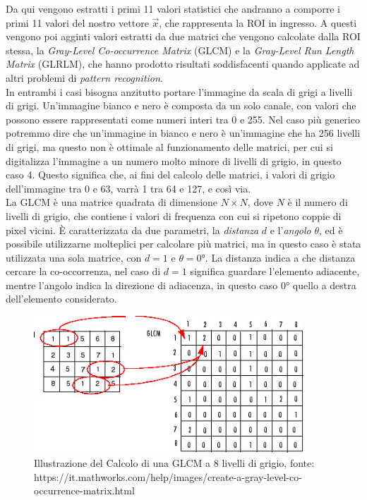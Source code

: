 Da qui vengono estratti i primi 11 valori statistici che andranno a comporre
i primi 11 valori del nostro vettore $\vec{x}$, che rappresenta la ROI in
ingresso.
A questi vengono poi agginti valori estratti da due matrici che vengono
calcolate dalla ROI stessa, la {\it Gray-Level Co-occurrence Matrix} (GLCM)
e la {\it Gray-Level Run Length Matrix} (GLRLM), che hanno prodotto
risultati soddisfacenti quando applicate ad altri problemi di
{\it pattern recognition}.\cite{GLCM}\\
In entrambi i casi bisogna anzitutto portare l'immagine da scala di grigi
a livelli di grigi.
Un'immagine bianco e nero è composta da un solo canale, con valori che possono
essere rappresentati come numeri interi tra 0 e 255.
Nel caso più generico potremmo dire che un'immagine in bianco e nero
è un'immagine che ha 256 livelli di grigi, ma questo non è ottimale al
funzionamento delle matrici, per cui si digitalizza l'immagine a un numero molto
minore di livelli di grigio, in questo caso 4.
Questo significa che, ai fini del calcolo delle matrici, i valori di grigio
dell'immagine tra 0 e 63, varrà 1 tra 64 e 127, e così via.\\
La GLCM è una matrice quadrata di dimensione $N \times N$, dove $N$ è il
numero di livelli di grigio, che contiene i valori di frequenza con cui
si ripetono coppie di pixel vicini.
È caratterizzata da due parametri, la {\it distanza} $d$ e l'{\it angolo} $\theta$,
ed è possibile utilizzarne molteplici per calcolare più matrici,
ma in questo caso è stata utilizzata una sola matrice, con $d=1$ e $\theta=0$°.
La distanza indica a che distanza cercare la co-occorrenza, nel caso di $d=1$
significa guardare l'elemento adiacente, mentre l'angolo indica la direzione
di adiacenza, in questo caso $0$° quello a destra dell'elemento considerato.

\begin{figure}[h]
    \center
    \includegraphics[width=0.9\textwidth]{./assets/glcm.jpg}
    \caption{Illustrazione del Calcolo di una GLCM a 8 livelli di grigio, fonte: https://it.mathworks.com/help/images/create-a-gray-level-co-occurrence-matrix.html}
\end{figure}

